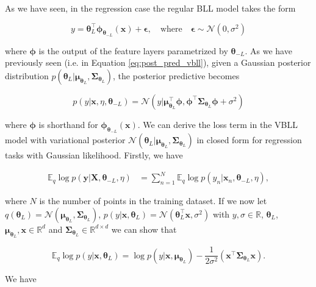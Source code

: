 \noindent As we have seen, in the regression case the regular BLL model takes the form 

\begin{equation}
    y = \bm{\theta}_L^\top\bm\phi_{\bm{\theta}_{-L}}(\mathbf{x})+\mathbf{\epsilon}, \quad \text{where} \quad \mathbf{\epsilon} \sim \mathcal{N}(0, \sigma^2)
\end{equation}

\noindent where $\bm\phi$ is the output of the feature layers parametrized by $\bm{\theta}_{-L}$. As we have previously seen (i.e. in Equation \ref{eq:post_pred_vbll}), given a Gaussian posterior distribution $p(\bm{\theta}_L|\bm\mu_{\bm{\theta}_L}, \bm\Sigma_{\bm{\theta}_L})$, the posterior predictive becomes

\begin{equation}
    p(y|\mathbf{x}, \eta, \bm{\theta}_{-L}) = \mathcal{N}(y|\bm\mu_{\bm{\theta}_L}^\top\bm\phi, \bm\phi^\top\bm\Sigma_{\bm{\theta}_L}\bm\phi+\sigma^2)
\end{equation}

\noindent where $\bm\phi$ is shorthand for $\bm\phi_{\bm{\theta}_{-L}}(\mathbf{x})$. We can derive the loss term in the VBLL model with variational posterior $\mathcal{N}(\bm{\theta}_L|\bm\mu_{\bm{\theta}_L}, \bm\Sigma_{\bm{\theta}_L})$  in closed form for regression tasks with Gaussian likelihood. Firstly, we have

\begin{align}
    \mathbb{E}_q\log p(\mathbf{y}|\mathbf{X}, \bm{\theta}_{-L}, \eta) &=  \sum^N_{n=1}\mathbb{E}_q\log p(y_n|\mathbf{x}_n, \bm{\theta}_{-L}, \eta),
    \label{eq:VBLL_regression}
\end{align}

\noindent where $N$ is the number of points in the training dataset. If we now let $q(\bm{\theta}_L)=\mathcal{N}(\bm\mu_{\bm{\theta}_L}, \bm\Sigma_{\bm{\theta}_L})$, $p(y|\mathbf{x}, \bm{\theta}_L)=\mathcal{N}(\bm{\theta}_L^\top\mathbf{x}, \sigma^2)$ with $y, \sigma \in \mathbb{R}$, $\bm{\theta}_L$, $\bm\mu_{\bm{\theta}_L}, \mathbf{x} \in \mathbb{R}^d$ and $\bm\Sigma_{\bm{\theta}_L} \in \mathbb{R}^{d\times d}$ we can show that

\begin{equation}
    \mathbb{E}_q\log p(y|\mathbf{x}, \bm\theta_L) = \log p(y|\mathbf{x}, \bm\mu_{\bm{\theta}_L})-\frac{1}{2\sigma^2}(\mathbf{x}^\top\bm\Sigma_{\bm{\theta}_L}\mathbf{x}).
\end{equation}

\noindent We have 

